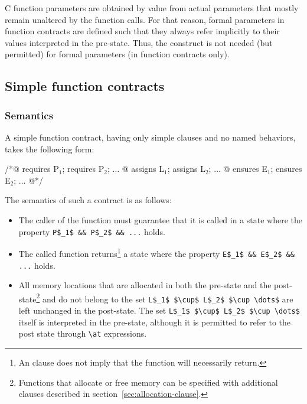 

C function parameters are obtained by
value from actual parameters that mostly remain unaltered by the
function calls. For that reason, formal parameters in function
contracts are defined such that they always refer implicitly to their
values interpreted in the pre-state.
Thus, the \old construct is not needed (but permitted) for formal parameters (in
function contracts only).

\subsection{Simple function contracts}
\label{sec:simplecontracts}
\subsubsection{Semantics}\label{sec:simple-contracts-definition}
A simple function contract, having only simple clauses and no named behaviors, takes the following
form:
\begin{listing}{1}
/*@ requires P$_1$; requires P$_2$; $\dots$
  @ assigns L$_1$;  assigns L$_2$;  $\dots$
  @ ensures E$_1$;  ensures E$_2$;  $\dots$
  @*/
\end{listing}
The semantics of such a contract is as follows:
\begin{itemize}
\item The caller of the function must guarantee that it is called in a
  state where the property \lstinline|P$_1$ && P$_2$ && ...| holds.
\item The called function returns\footnote{An \ensures{} clause does not
  imply that the function will necessarily return.} a state where the property
  \lstinline|E$_1$ && E$_2$ && ...| holds.
\item All memory locations that are allocated in both the pre-state and
  the post-state\footnote{Functions that allocate or free memory can be
    specified with additional clauses described in
    section~\ref{sec:allocation-clause}.}
  and do not belong to the
  set \lstinline|L$_1$ $\cup$ L$_2$ $\cup \dots$| are left unchanged in the
  post-state. The set \lstinline|L$_1$ $\cup$ L$_2$ $\cup \dots$|
  itself is interpreted in the pre-state, although it is permitted to
  refer to the post state through \lstinline|\at| expressions.
\end{itemize}

